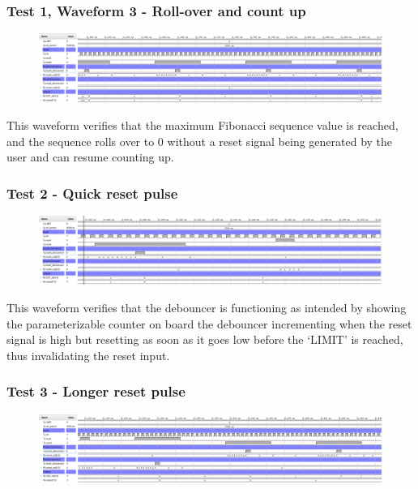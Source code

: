 \documentclass[11pt]{report}
\begin{document}
\subsubsection*{Test 1, Waveform 3 - Roll-over and count up}
\begin{figure}[H]
    \includegraphics[width=\columnwidth]{Reports/Lab1/Waveforms/04_roll-over-and-count.png}
\end{figure}
This waveform verifies that the maximum Fibonacci sequence value is reached, and the sequence rolls over to 0 without a reset signal being generated by the user and can resume counting up.

\subsubsection*{Test 2 - Quick reset pulse}
\begin{figure}[H]
    \includegraphics[width=\columnwidth]{Reports/Lab1/Waveforms/05_quick-reset-pulse.png}
\end{figure}
This waveform verifies that the debouncer is functioning as intended by showing the parameterizable counter on board the debouncer incrementing when the reset signal is high but resetting as soon as it goes low before the `LIMIT' is reached, thus invalidating the reset input.

\subsubsection*{Test 3 - Longer reset pulse}
\begin{figure}[H]
    \includegraphics[width=\columnwidth]{Reports/Lab1/Waveforms/06_longer-reset-pulse.png}
\end{figure}
\end{document}
